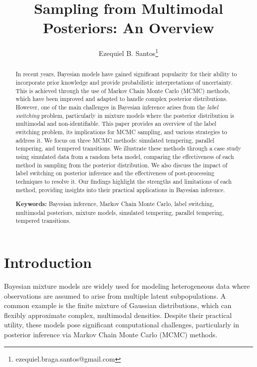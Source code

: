 \documentclass[11pt]{article}
\title{Sampling from Multimodal Posteriors: An Overview}
\author{Ezequiel B. Santos\thanks{ezequiel.braga.santos@gmail.com}}
\affil{School of Applied Mathematics - Getulio Vargas Foundation (FGV EMAp)}
\date{}
\begin{document}
\maketitle

\begin{abstract}

In recent years, Bayesian models have gained significant popularity for their ability to incorporate prior 
knowledge and provide probabilistic interpretations of uncertainty. This is achieved through the use of
Markov Chain Monte Carlo (MCMC) methods, which have been improved and adapted to handle complex posterior
distributions. However, one of the main challenges in Bayesian inference arises from the 
\textit{label switching} problem, particularly in mixture models where the posterior distribution is
multimodal and non-identifiable. This paper provides an overview of the label switching problem, its 
implications for MCMC sampling, and various strategies to address it. We focus on three MCMC methods:
simulated tempering, parallel tempering, and tempered transitions. We illustrate these methods through a
case study using simulated data from a random beta model, comparing the effectiveness of each method in
sampling from the posterior distribution. We also discuss the impact of label switching on posterior inference
and the effectiveness of post-processing techniques to resolve it. Our findings highlight the strengths and
limitations of each method, providing insights into their practical applications in Bayesian inference.

\textbf{Keywords:} Bayesian inference, Markov Chain Monte Carlo, label switching, multimodal posteriors,
mixture models, simulated tempering, parallel tempering, tempered transitions.

\end{abstract}

\section{Introduction}

Bayesian mixture models are widely used for modeling heterogeneous data where observations are assumed to arise 
from multiple latent subpopulations. A common example is the finite mixture of Gaussian distributions, which can 
flexibly approximate complex, multimodal densities. Despite their practical utility, these models pose significant 
computational challenges, particularly in posterior inference via Markov Chain Monte Carlo (MCMC) methods.
\end{document}
